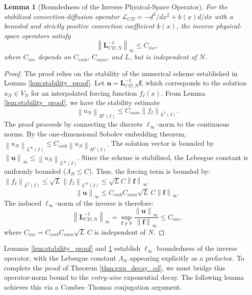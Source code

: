 \documentclass[pdflatex,sn-mathphys-num]{sn-jnl}%
\theoremstyle{thmstyleone}%
\newtheorem{lemma}{Lemma}
\newcommand{\norm}[1]{\left\lVert#1\right\rVert}
\newcommand{\mat}[1]{\mathbf{#1}}
\newcommand{\vect}[1]{\mathbf{#1}}
\begin{document}
\begin{lemma}[Boundedness of the Inverse Physical-Space Operator]
\label{lem:L_inv_bound}
For the stabilized convection-diffusion operator $\mathcal{L}_{CD} = -d^2/dx^2 + k(x)d/dx$ with a bounded and strictly positive convection coefficient $k(x)$, the inverse physical-space operators satisfy
\begin{equation}\norm{\mat{L}_{CD,N}^{-1}}_\infty \le C_{inv},\end{equation}
where $C_{inv}$ depends on $C_{emb}$, $C_{num}$, and $L$, but is independent of $N$.
\end{lemma}
\begin{proof}
The proof relies on the stability of the numerical scheme established in Lemma \ref{lem:stability_proof}. Let $\vect{u} = \mat{L}_{CD,N}^{-1} \vect{f}$, which corresponds to the solution $u_N \in V_N$ for an interpolated forcing function $f_I(x)$. From Lemma \ref{lem:stability_proof}, we have the stability estimate
\begin{equation}
\norm{u_N}_{H^1(I)} \le C_{num} \norm{f_I}_{L^2(I)}.
\end{equation}
The proof proceeds by connecting the discrete $\ell_\infty$-norm to the continuous norms. By the one-dimensional Sobolev embedding theorem, $\norm{u_N}_{L^\infty(I)} \le C_{emb} \norm{u_N}_{H^1(I)}$. The solution vector is bounded by $\norm{\vect{u}}_\infty \le \norm{u_N}_{L^\infty(I)}$. Since the scheme is stabilized, the Lebesgue constant is uniformly bounded ($\Lambda_N \le C$). Thus, the forcing term is bounded by: $\norm{f_I}_{L^2(I)} \le \sqrt{L}\norm{f_I}_{L^\infty(I)} \le \sqrt{L} C \norm{\vect{f}}_\infty$.
\begin{equation}
\norm{\vect{u}}_\infty \le C_{emb} C_{num} \sqrt{L}\, C \norm{\vect{f}}_\infty.
\end{equation}
The induced $\ell_\infty$-norm of the inverse is therefore:
\begin{equation} \norm{\mat{L}_{CD,N}^{-1}}_\infty = \sup_{\vect{f} \neq 0} \frac{\norm{\vect{u}}_\infty}{\norm{\vect{f}}_\infty} \le C_{inv}, \end{equation}
where $C_{inv} = C_{emb} C_{num} \sqrt{L}\, C$ is independent of $N$.
\end{proof}

Lemmas \ref{lem:stability_proof} and \ref{lem:L_inv_bound} establish $\ell_\infty$ boundedness of the inverse operator, with the Lebesgue constant $\Lambda_N$ appearing explicitly as a prefactor. To complete the proof of Theorem \ref{thm:exp_decay_cd}, we must bridge this operator-norm bound to the \emph{entry-wise} exponential decay. The following lemma achieves this via a Combes--Thomas conjugation argument.
\end{document}

